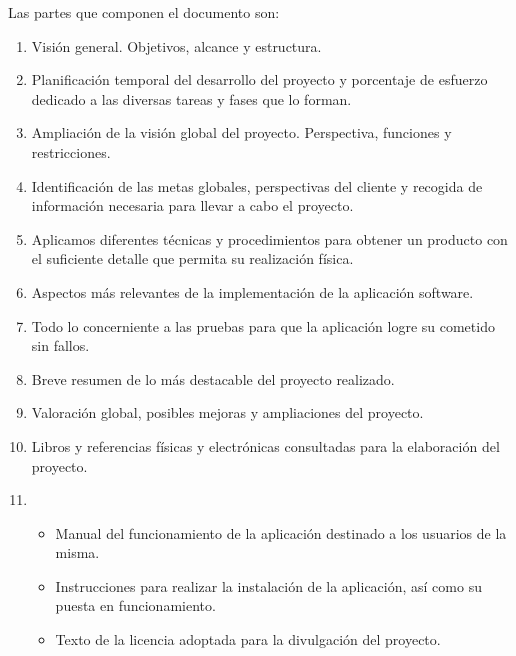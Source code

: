 Las partes que componen el documento son:

\begin{enumerate}
  \item {} Visión general. Objetivos, alcance y
    estructura.
  \item {} Planificación temporal del
    desarrollo del proyecto y porcentaje de esfuerzo dedicado a las
    diversas tareas y fases que lo forman.
  \item {} Ampliación de la
    visión global del proyecto. Perspectiva, funciones y
    restricciones.
  \item {} Identificación de las metas globales,
    perspectivas del cliente y recogida de información necesaria para
    llevar a cabo el proyecto.
  \item {} Aplicamos diferentes técnicas y
    procedimientos para obtener un producto con el suficiente detalle
    que permita su realización física.
  \item {} Aspectos más relevantes de la
    implementación de la aplicación software.
  \item {} Todo lo concerniente a las pruebas para
    que la aplicación logre su cometido sin fallos.
  \item {} Breve resumen de lo más destacable del
    proyecto realizado.
  \item {} Valoración global, posibles mejoras y
    ampliaciones del proyecto.
  \item {} Libros y referencias físicas y
    electrónicas consultadas para la elaboración del proyecto.
  \item {}
    \begin{itemize}
      \item {} Manual del funcionamiento de la
        aplicación destinado a los usuarios de la misma.
      \item {} Instrucciones para realizar la instalación de
        la aplicación, así como su puesta en funcionamiento.
      \item {} Texto de la licencia adoptada para la
        divulgación del proyecto.
    \end{itemize}
\end{enumerate}

